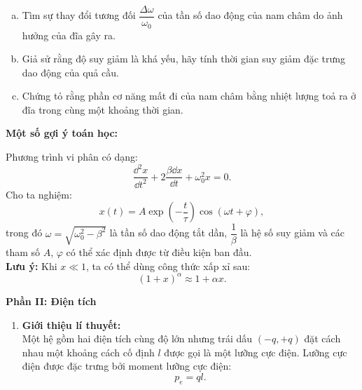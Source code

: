 \begin{vd}
\begin{enumerate}[1)]
\begin{enumerate}[a)]
\begin{center}
 \end{center}
 
\item Tìm sự thay đổi tương đối $\dfrac{\Delta \omega}{\omega_0}$ của tần số dao động của nam châm do ảnh hưởng của đĩa gây ra.
\item Giả sử rằng độ suy giảm là khá yếu, hãy tính thời gian suy giảm đặc trưng dao động của quả cầu.
\item Chứng tỏ rằng phần cơ năng mất đi của nam châm bằng nhiệt lượng toả ra ở đĩa trong cùng một khoảng thời gian.
\end{enumerate}
\begin{center}
    \textbf{Một số gợi ý toán học:}\\
    \end{center}
    Phương trình vi phân có dạng:
    \[
\dfrac{\dd^{2} x}{\dd t^{2}}+2 \dfrac{\beta \dd x}{\dd t}+\omega_{0}^{2} x=0.
\]
Cho ta nghiệm:
\[
x(t)=A \exp \left(-\dfrac{t}{\tau}\right) \cos (\omega t+\varphi),
\]
trong đó $\omega=\sqrt{\omega_{0}^{2}-\beta^{2}}$ là tần số dao động tắt dần, $\dfrac{1}{\beta}$ là hệ số suy giảm và các tham số $A$, $\varphi$ có thể xác định được từ điều kiện ban đầu.\\
\textbf{Lưu ý:} Khi $x \ll 1$, ta có thể dùng công thức xấp xỉ sau:
\[(1+x)^{\alpha} \approx 1+\alpha x.\]
\end{enumerate}
\begin{center}
\textbf{Phần II: Điện tích}
\end{center}
\begin{enumerate}[1)]
\item \textbf{Giới thiệu lí thuyết:} \\
Một hệ gồm hai điện tích cùng độ lớn nhưng trái dấu $(-q,+q)$ đặt cách nhau một khoảng cách cố định $l$ được gọi là một lưỡng cực điện. Lưỡng cực điện được đặc trưng bởi moment lưỡng cực điện:
\[p_e=ql.\]
\begin{center}
    


\end{center}
\end{enumerate}
\end{vd}
